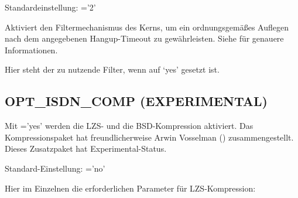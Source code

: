 \begin{description}
  
  Standardeinstellung: ='2'

\begin{sloppypar}

Aktiviert den Filtermechanismus des Kerns, um ein ordnungsgemäßes
Auflegen nach dem angegebenen Hangup-Timeout zu gewährleisten. Siehe
für genauere Informationen.
\end{sloppypar}


Hier steht der zu nutzende Filter, wenn  auf `yes' gesetzt ist.

\end{description}


\subsection{OPT\_ISDN\_COMP (EXPERIMENTAL)}

Mit ='yes' werden die LZS- und die BSD-Kompression
aktiviert. Das Kompressionspaket hat freundlicherweise Arwin Vosselman
() zusammengestellt. Dieses Zusatzpaket hat
Experimental-Status.

Standard-Einstellung: ='no'

Hier im Einzelnen die erforderlichen Parameter für LZS-Kompression:


